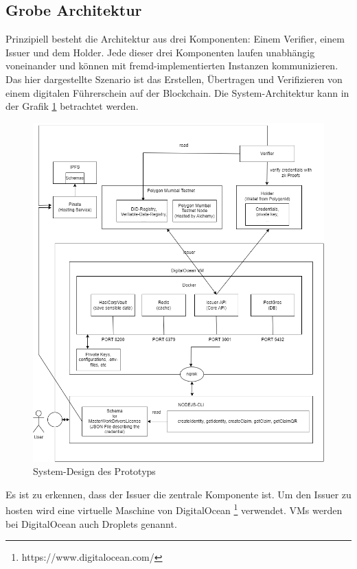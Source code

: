 \subsection{Grobe Architektur}
Prinzipiell besteht die Architektur aus drei Komponenten: Einem Verifier, einem Issuer und dem Holder. Jede dieser drei Komponenten laufen unabhängig voneinander und können mit fremd-implementierten Instanzen kommunizieren. Das hier dargestellte Szenario ist das Erstellen, Übertragen und Verifizieren von einem digitalen Führerschein auf der Blockchain. Die System-Architektur kann in der Grafik \ref{fig:design} betrachtet werden.
\begin{figure}[H]
	\centering
	\includegraphics[scale=0.4]{media/system-design}
	\caption{System-Design des Prototyps}
	\label{fig:design}
\end{figure}
Es ist zu erkennen, dass der Issuer die zentrale Komponente ist. Um den Issuer zu hosten wird eine virtuelle Maschine von DigitalOcean \footnote{https://www.digitalocean.com/} verwendet. VMs werden bei DigitalOcean auch Droplets genannt.

